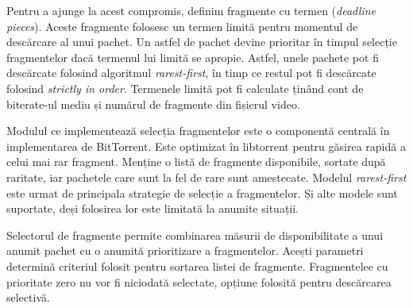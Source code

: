 Pentru a ajunge la acest compromis, definim fragmente cu termen
(\textit{deadline pieces}). Aceste fragmente folosesc un termen limită pentru
momentul de descărcare al unui pachet. Un astfel de pachet devine prioritar în
timpul selecție fragmentelor dacă termenul lui limită se apropie. Astfel,
unele pachete pot fi descărcate folosind algoritmul \textit{rarest-first},
în timp ce restul pot fi descărcate folosind \textit{strictly in order}.
Termenele limită pot fi calculate ținând cont de biterate-ul mediu și numărul
de fragmente din fișierul video.

Modulul ce implementează selecția fragmentelor este o componentă centrală în
implementarea de BitTorrent. Este optimizat în libtorrent pentru găsirea
rapidă a celui mai rar fragment. Menține o listă de fragmente disponibile,
sortate după raritate, iar pachetele care sunt la fel de rare sunt amestecate.
Modelul \textit{rarest-first} este urmat de principala strategie de selecție a
fragmentelor. Și alte modele sunt suportate, deși folosirea lor este limitată
la anumite situații.

Selectorul de fragmente permite combinarea măsurii de disponibilitate a unui
anumit pachet cu o anumită prioritizare a fragmentelor. Acești parametri
determină criteriul folosit pentru sortarea listei de fragmente. Fragmentelee
cu prioritate zero nu vor fi niciodată selectate, opțiune folosită pentru
descărcarea selectivă.

